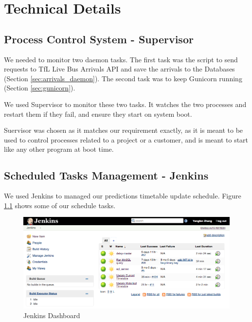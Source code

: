 \chapter{Technical Details}


\section{Process Control System - Supervisor}
\par We needed to monitor two daemon tasks. The first task was the script to send requests to TfL Live Bus Arrivals API and save the arrivals to the Databases (Section \ref{sec:arrivals_daemon}). The second task was to keep Gunicorn running (Section \ref{sec:gunicorn}).

\par We used Supervisor\cite{supervisor} to monitor these two tasks. It watches the two processes and restart them if they fail, and ensure they start on system boot.

\par Suervisor was chosen as it matches our requirement exactly, as it is meant to be used to control processes related to a project or a customer, and is meant to start like any other program at boot time.

\section{Scheduled Tasks Management - Jenkins}
\par We used Jenkins\cite{jenkins} to managed our predictions timetable update schedule. Figure \ref{fig:jenkins} shows some of our schedule tasks.

\begin{figure}
\centering
\includegraphics[width=\textwidth]{figures/jenkins.png}
\caption{\label{fig:jenkins} Jenkins Dashboard}
\end{figure}



